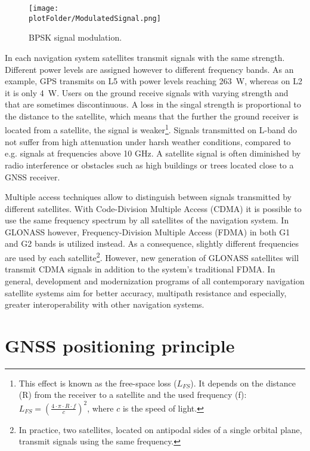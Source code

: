 \begin{wrapfigure}{l}{0.4\textwidth} 
  \begin{center}
\texttt{[image: \\plotFolder/ModulatedSignal.png]}
\caption{BPSK signal modulation.} 
    \label{fig:SignalModulation}
  \end{center}
\end{wrapfigure} 
In each navigation system satellites transmit signals with the same strength. Different power levels are assigned however to different frequency bands. As an example, 
GPS transmits on L5 with power levels reaching 263~W, whereas on L2 it is only 4~W. Users on the ground receive
signals with varying strength and that are sometimes discontinuous. A loss in the singal strength is proportional to the distance to the satellite, which means that the 
further the ground receiver is located from a satellite, the signal is weaker\footnote{This effect is known as the free-space loss ($L_{FS}$). It depends on the distance (R) from the receiver 
to a satellite and the used frequency (f): $  L_{FS} =  \left( \frac{4 \cdot \pi \cdot R \cdot f }{c} \right)^2 $, where $c$ is the speed of light. }. Signals transmitted 
on L-band do not suffer from high attenuation under harsh weather conditions, compared to e.g. signals at frequencies above 10 GHz.
A satellite signal is often diminished by radio interference or obstacles such as high buildings or trees located close to a GNSS receiver.  \par{}
Multiple ­access techniques allow to distinguish between signals transmitted by different satellites. With Code-Division Multiple Access (CDMA) it is possible to use the same frequency
spectrum by all satellites of the navigation system. In GLONASS however, Frequency-Division Multiple Access (FDMA) in both G1 and G2 bands is utilized instead. As a consequence, slightly different 
frequencies are used by each satellite\footnote{In practice, two satellites, located on antipodal sides of a single orbital plane, transmit signals using the same frequency.}. However, new generation 
of GLONASS satellites will transmit CDMA signals in addition to the system's traditional FDMA. In general, development and modernization programs of all contemporary navigation satellite 
systems aim for better accuracy, multipath resistance and especially, greater interoperability with other navigation systems.

\section{GNSS positioning principle}

